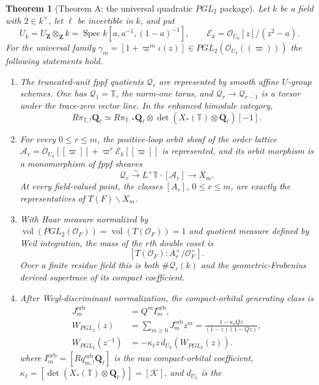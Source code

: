 \documentclass[11pt]{article}
\newtheorem{theorem}{Theorem}[section]
\theoremstyle{definition}
\theoremstyle{remark}
\newcommand{\Qell}{\mathbf Q_\ell}
\newcommand{\UZ}{U_{\mathbf Z}}
\newcommand{\Uk}{U_k}
\newcommand{\kappaell}{\kappa_{\ell}}
\newcommand{\cK}{\mathcal K}
\newcommand{\Spec}{\operatorname{Spec}}
\begin{document}
\begin{theorem}[Theorem A: the universal quadratic $PGL_2$ package]
\label{thm:main-PGL2-package}
Let $k$ be a field with $2\in k^\times$, let $\ell$ be invertible in $k$, and
put
\[
 \Uk=\UZ\otimes_{\mathbf Z}k
 =\Spec k[a,a^{-1},(1-a)^{-1}],
 \qquad \mathcal E_k=\mathcal O_{\Uk}[z]/(z^2-a).
\]
For the universal family
$\gamma_m=[1+\varpi^m\iota(z)]\in
PGL_2(\mathcal O_{\Uk}((\varpi)))$ the following
statements hold.
\begin{enumerate}[label=\textup{(\roman*)}]
\item The truncated-unit fppf quotients $\mathscr Q_r$ are represented by
  smooth affine $U$-group schemes.  One has $\mathscr Q_1=\mathbb T$, the
  norm-one torus, and $\mathscr Q_r\to\mathscr Q_{r-1}$ is a torsor under the
  trace-zero vector line.  In the enhanced bimodule category,
  \[
   R\pi_{\mathbb T,!}\Qell
   \simeq R\pi_{\mathbb T,*}\Qell
   \otimes\det(X_*(\mathbb T)\otimes\Qell)[-1].
  \]
\item For every $0\le r\le m$, the positive-loop orbit sheaf of the order
  lattice
  $\mathcal A_r=\mathcal O_{\Uk}[[\varpi]]+\varpi^r\mathcal E_k[[\varpi]]$
  is represented, and its orbit morphism is a monomorphism of fppf sheaves
  \[
   \mathscr Q_r\xrightarrow{\sim}
   L^+\mathbb T\cdot[\mathcal A_r]\longrightarrow X_m.
  \]
  At every field-valued point, the classes $[A_r]$, $0\le r\le m$, are exactly
  the representatives of $T(F)\backslash X_m$.
\item With Haar measure normalized by
  $\operatorname{vol}(PGL_2(\mathcal O_F))=
   \operatorname{vol}(T(\mathcal O_F))=1$ and quotient measure defined by
  Weil integration, the mass of the $r$th double coset is
  \[
   [T(\mathcal O_F):A_r^\times/\mathcal O_F^\times].
  \]
  Over a finite residue field this is both $\#\mathscr Q_r(k)$ and the
  geometric-Frobenius derived supertrace of its compact coefficient.
\item After Weyl-discriminant normalization, the compact-orbital generating
  class is
  \begin{align*}
   J_m^{\mathrm{orb}}&=Q^mI_m^{\mathrm{orb}},\\
   W_{PGL_2}(z)&=\sum_{m\ge0}J_m^{\mathrm{orb}}z^m
   =\frac{1-\kappaell Qz}{(1-z)(1-Qz)},\\
   W_{PGL_2}(z^{-1})&=-\kappaell z\,d_{\Uk}(W_{PGL_2}(z)).
  \end{align*}
  where $I_m^{\mathrm{orb}}=[Rq^{\mathrm{orb}}_{m,!}\Qell]$ is the raw
  compact-orbital coefficient,
  $\kappaell=[\det(X_*(\mathbb T)\otimes\Qell)]=[\cK]$, and $d_{\Uk}$ is the

\end{enumerate}
\end{theorem}
\end{document}
